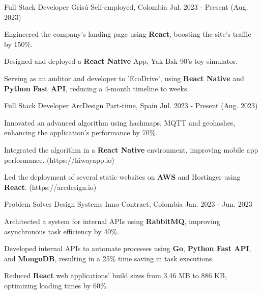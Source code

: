 \newcommand{\quotes}[1]{``#1''}

\begin{cventries}

  \cventry
  {Full Stack Developer} %
  {Grisú} %
  {Self-employed, Colombia} %
  {Jul. 2023 - Present (Aug. 2023)} %
  {
    \begin{cvitems} %
      \item {Engineered the company's landing page using \textbf{React}, boosting the site's traffic by 150\%.}
      \item {Designed and deployed a \textbf{React Native} App, Yak Bak 90's toy simulator.}
      \item {Serving as an auditor and developer to 'EcoDrive', using \textbf{React Native} and \textbf{Python Fast API}, reducing a 4-month timeline to weeks.}
    \end{cvitems}
  }

  \cventry
  {Full Stack Developer} %
  {ArcDesign} %
  {Part-time, Spain} %
  {Jul. 2023 - Present (Aug. 2023)} %
  {
    \begin{cvitems} %
      \item {Innovated an advanced algorithm using hashmaps, MQTT and geohashes, enhancing the application's performance by 70\%.}
      \item {Integrated the algorithm in a \textbf{React Native} environment, improving mobile app performance. (https://hiwayapp.io)}
      \item {Led the deployment of several static websites on \textbf{AWS} and Hostinger using \textbf{React}. (https://arcdesign.io)}
    \end{cvitems}
  }

  \cventry
  {Problem Solver} %
  {Design Systems Inno} %
  {Contract, Colombia} %
  {Jan. 2023 - Jun. 2023} %
  {
    \begin{cvitems} %
      \item {Architected a system for internal APIs using \textbf{RabbitMQ}, improving asynchronous task efficiency by 40\%.}
      \item {Developed internal APIs to automate processes using \textbf{Go}, \textbf{Python Fast API}, and \textbf{MongoDB}, resulting in a 25\% time saving in task executions.}
      \item {Reduced \textbf{React} web applications' build sizes from 3.46 MB to 886 KB, optimizing loading times by 60\%.}
    \end{cvitems}
  }


\end{cventries}
